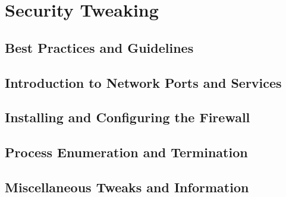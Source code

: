 \chapter{Security Tweaking}
\localtableofcontents
\clearpage

\section{Best Practices and Guidelines}

\linebreak

\section{Introduction to Network Ports and Services}

\linebreak

\section{Installing and Configuring the Firewall}

\linebreak

\section{Process Enumeration and Termination}

\linebreak

\section{Miscellaneous Tweaks and Information}

\linebreak